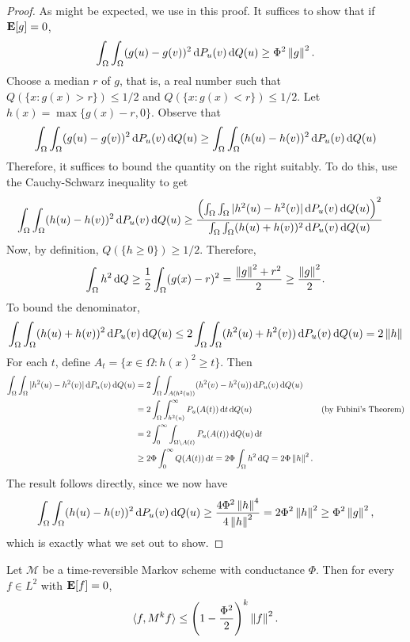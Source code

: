\begin{proof}
	As might be expected, we use  in this proof. It suffices to show that if $\textbf{E}[g]=0$,
	\[ \int_\Omega \int_\Omega (g(u)-g(v))^2 \operatorname{d}\!{P}_u(v)\operatorname{d}\!{Q}(u) \geq \Phi^2 \left\lVert g\right\rVert^2. \]
	Choose a median $r$ of $g$, that is, a real number such that $Q(\{x:g(x)>r\}) \leq 1/2$ and $Q(\{x:g(x)<r\}) \leq 1/2$. Let $h(x)=\max\{g(x)-r,0\}$. Observe that
	\[ \int_\Omega \int_\Omega (g(u)-g(v))^2 \operatorname{d}\!{P}_u(v)\operatorname{d}\!{Q}(u) \geq \int_\Omega \int_\Omega (h(u)-h(v))^2 \operatorname{d}\!{P}_u(v)\operatorname{d}\!{Q}(u) \]
	Therefore, it suffices to bound the quantity on the right suitably. To do this, use the Cauchy-Schwarz inequality to get
	\begin{align*}
		\int_\Omega \int_\Omega (h(u)-h(v))^2 \operatorname{d}\!{P}_u(v)\operatorname{d}\!{Q}(u) &\geq \frac{\left(\int_\Omega \int_\Omega |h^2(u)-h^2(v)| \operatorname{d}\!{P}_u(v)\operatorname{d}\!{Q}(u)\right)^2}{\int_\Omega \int_\Omega (h(u)+h(v))^2 \operatorname{d}\!{P}_u(v)\operatorname{d}\!{Q}(u)}
	\end{align*}
	Now, by definition, $Q(\{h\geq 0\}) \geq 1/2$. Therefore,
	\[ \int_\Omega h^2\operatorname{d}\!{Q} \geq \frac{1}{2} \int_\Omega (g(x)-r)^2 = \frac{\left\lVert g\right\rVert^2+r^2}{2} \geq \frac{\left\lVert g\right\rVert^2}{2}. \]
	To bound the denominator,
	\[ \int_\Omega \int_\Omega (h(u)+h(v))^2 \operatorname{d}\!{P}_u(v)\operatorname{d}\!{Q}(u) \leq 2 \int_\Omega \int_\Omega (h^2(u)+h^2(v)) \operatorname{d}\!{P}_u(v)\operatorname{d}\!{Q}(u) = 2\left\lVert h\right\rVert \]
	For each $t$, define $A_t = \{x\in\Omega : h(x)^2 \geq t\}$. Then
	\begin{align*}
		\int_\Omega \int_\Omega |h^2(u)-h^2(v)| \d{P}_u(v)\d{Q}(u) &= 2 \int_\Omega \int_{A(h^2(u))} (h^2(v)-h^2(u)) \d{P}_u(v)\d{Q}(u) \\
			&= 2 \int_\Omega \int_{h^2(u)}^\infty P_u(A(t)) \d{t}\d{Q}(u) & (\text{by Fubini's Theorem}) \\
			&= 2 \int_0^\infty \int_{\Omega\setminus A(t)} P_u(A(t)) \d{Q}(u)\d{t} \\
			&\geq 2\Phi \int_0^\infty Q(A(t))\d{t} = 2\Phi \int_\Omega h^2\d{Q} = 2\Phi\norm{h}^2.
	\end{align*}
	The result follows directly, since we now have
	\[ \int_\Omega \int_\Omega (h(u)-h(v))^2 \operatorname{d}\!{P}_u(v)\operatorname{d}\!{Q}(u) \geq \frac{4\Phi^2\left\lVert h\right\rVert^4}{4\left\lVert h\right\rVert^2} = 2\Phi^2\left\lVert h\right\rVert^2 \geq \Phi^2\left\lVert g\right\rVert^2, \]
	which is exactly what we set out to show.
\end{proof}

\begin{corollary}
	Let $\mathcal{M}$ be a time-reversible Markov scheme with conductance $\Phi$. Then for every $f\in L^2$ with $\textbf{E}[f]=0$,
	\[ \langle f,M^k f\rangle \leq \left(1-\frac{\Phi^2}{2}\right)^k\left\lVert f\right\rVert^2. \]
\end{corollary}

